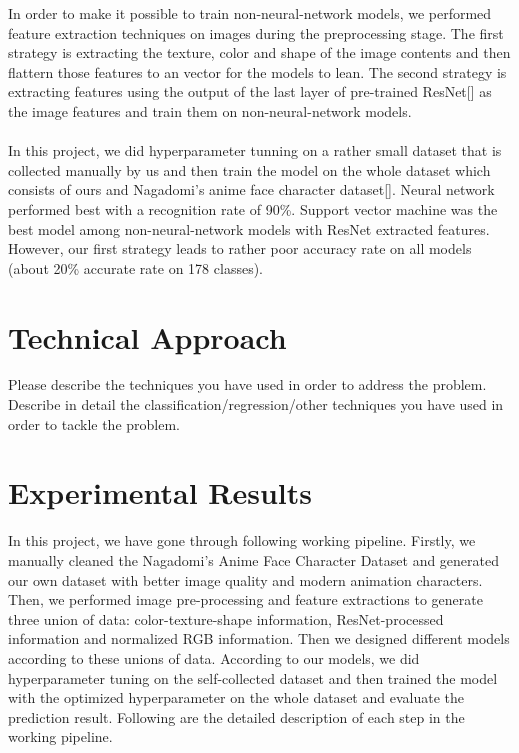\documentclass[11.5pt]{article}
\begin{document}
    In order to make it possible to train non-neural-network models, we performed feature extraction techniques on images during the preprocessing stage. The first strategy is extracting the texture, color and shape of the image contents and then flattern those features to an vector for the models to lean. The second strategy is extracting features using the output of the last layer of pre-trained ResNet[] as the image features and train them on non-neural-network models.\\ \\
    In this project, we did hyperparameter tunning on a rather small dataset that is collected manually by us and then train the model on the whole dataset which consists of ours and Nagadomi's anime face character dataset[]. Neural network performed best with a recognition rate of 90\%. Support vector machine was the best model among non-neural-network models with ResNet extracted features. However, our first strategy leads to rather poor accuracy rate on all models (about 20\% accurate rate on 178 classes).


    \section{Technical Approach}
    Please describe the techniques you have used in order to address the problem.
    Describe in detail the classification/regression/other techniques you have used in order to tackle the problem.


    \section{Experimental Results}
    In this project, we have gone through following working pipeline.
    Firstly, we manually cleaned the Nagadomi's Anime Face Character Dataset and generated our own dataset with better image quality and modern animation characters.
    Then, we performed image pre-processing and feature extractions to generate three union of data: color-texture-shape information, ResNet-processed information and normalized RGB information.
    Then we designed different models according to these unions of data.
    According to our models, we did hyperparameter tuning on the self-collected dataset and then trained the model with the optimized hyperparameter on the whole dataset and evaluate the prediction result.
    Following are the detailed description of each step in the working pipeline.
\end{document}
